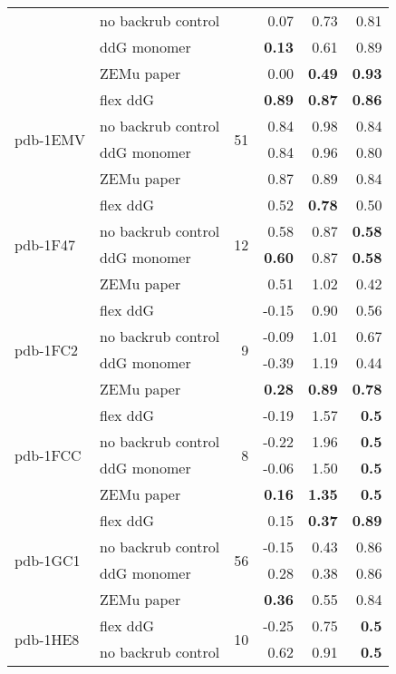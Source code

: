 {\begin{longtable}{llrrrr}
 & no backrub control & & 0.07 & 0.73 & 0.81  \\
 & ddG monomer & & \textbf{0.13} & 0.61 & 0.89  \\
 & ZEMu paper & & 0.00 & \textbf{0.49} & \textbf{0.93}  \\
\hline
 \multirow{ 4}{*}{pdb-1EMV} & flex ddG & \multirow{ 4}{*}{51} & \textbf{0.89} & \textbf{0.87} & \textbf{0.86}  \\
 & no backrub control & & 0.84 & 0.98 & 0.84  \\
 & ddG monomer & & 0.84 & 0.96 & 0.80  \\
 & ZEMu paper & & 0.87 & 0.89 & 0.84  \\
\hline
 \multirow{ 4}{*}{pdb-1F47} & flex ddG & \multirow{ 4}{*}{12} & 0.52 & \textbf{0.78} & 0.50  \\
 & no backrub control & & 0.58 & 0.87 & \textbf{0.58}  \\
 & ddG monomer & & \textbf{0.60} & 0.87 & \textbf{0.58}  \\
 & ZEMu paper & & 0.51 & 1.02 & 0.42  \\
\hline
 \multirow{ 4}{*}{pdb-1FC2} & flex ddG & \multirow{ 4}{*}{9} & -0.15 & 0.90 & 0.56  \\
 & no backrub control & & -0.09 & 1.01 & 0.67  \\
 & ddG monomer & & -0.39 & 1.19 & 0.44  \\
 & ZEMu paper & & \textbf{0.28} & \textbf{0.89} & \textbf{0.78}  \\
\hline
 \multirow{ 4}{*}{pdb-1FCC} & flex ddG & \multirow{ 4}{*}{8} & -0.19 & 1.57 & \textbf{0.5}  \\
 & no backrub control & & -0.22 & 1.96 & \textbf{0.5}  \\
 & ddG monomer & & -0.06 & 1.50 & \textbf{0.5}  \\
 & ZEMu paper & & \textbf{0.16} & \textbf{1.35} & \textbf{0.5}  \\
\hline
 \multirow{ 4}{*}{pdb-1GC1} & flex ddG & \multirow{ 4}{*}{56} & 0.15 & \textbf{0.37} & \textbf{0.89}  \\
 & no backrub control & & -0.15 & 0.43 & 0.86  \\
 & ddG monomer & & 0.28 & 0.38 & 0.86  \\
 & ZEMu paper & & \textbf{0.36} & 0.55 & 0.84  \\
\hline
 \multirow{ 4}{*}{pdb-1HE8} & flex ddG & \multirow{ 4}{*}{10} & -0.25 & 0.75 & \textbf{0.5}  \\
 & no backrub control & & 0.62 & 0.91 & \textbf{0.5}  \\

\end{longtable}}
